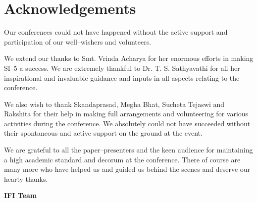 
\chapter*{Acknowledgements}\label{ack}

Our conferences could not have happened without the active support and participation of our well–wishers and volunteers.

We extend our thanks to Smt. Vrinda Acharya for her enormous efforts in making SI–5 a success. We are extremely thankful to Dr. T. S. Sathyavathi for all her inspirational and invaluable guidance and inputs in all aspects relating to the conference.

We also wish to thank Skandaprasad, Megha Bhat, Sucheta Tejaswi and Rakshita for their help in making full arrangements and volunteering for various activities during the conference. We absolutely could not have succeeded without their spontaneous and active support on the ground at the event.

We are grateful to all the paper–presenters and the keen audience for maintaining a high academic standard and decorum at the conference. There of course are many more who have helped us and guided us behind the scenes and deserve our hearty thanks.

\begin{flushright}
\textbf{IFI Team}
\end{flushright}

